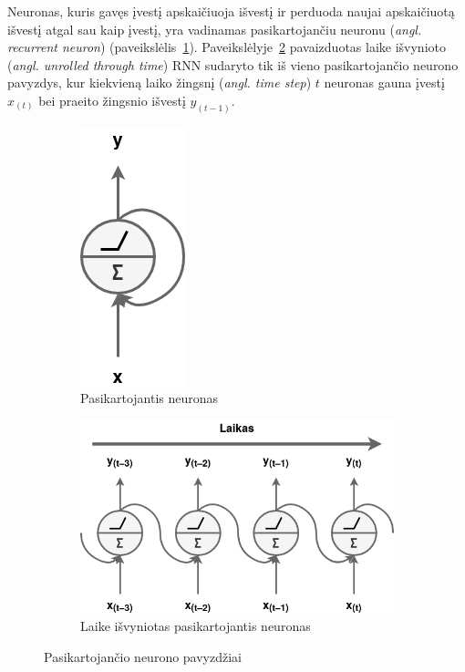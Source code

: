 \documentclass{VUMIFPSbakalaurinis}
\begin{document}
{
	Neuronas, kuris gavęs įvestį apskaičiuoja išvestį ir perduoda naujai apskaičiuotą išvestį atgal sau kaip įvestį, yra vadinamas pasikartojančiu neuronu (\textit{angl. recurrent neuron}) (paveikslėlis~\ref{img:recurrent_neuron}). Paveikslėlyje~\ref{img:unrolled} pavaizduotas laike išvynioto (\textit{angl. unrolled through time}) RNN sudaryto tik iš vieno pasikartojančio neurono pavyzdys, kur kiekvieną laiko žingsnį (\textit{angl. time step}) \(t\) neuronas gauna įvestį \(x_{(t)}\) bei praeito žingsnio išvestį \(y_{(t-1)}\).
	
	\begin{figure}[H]
		\centering
		\begin{subfigure}[b]{.33\textwidth}
			\centering
			\includegraphics[scale=0.5]{img/recurrent_neuron}
			\caption{Pasikartojantis neuronas}
			\label{img:recurrent_neuron}
		\end{subfigure}%
		\begin{subfigure}[b]{.66\textwidth}
			\centering
			\includegraphics[scale=0.5]{img/unrolled}
			\caption{Laike išvyniotas pasikartojantis neuronas}
			\label{img:unrolled}
		\end{subfigure}
		\caption{Pasikartojančio neurono pavyzdžiai}
		\label{img:rnn_simple}
	\end{figure} 

}
\end{document}
